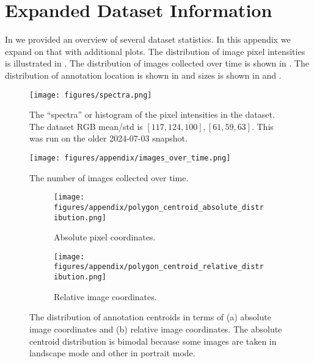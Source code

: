 \appendix

\section{Expanded Dataset Information}

In  we provided an overview of several dataset statistics.
In this appendix we expand on that with additional plots.
The distribution of image pixel intensities is illustrated in .
The distribution of images collected over time is shown in .
The distribution of annotation location is shown in  and sizes is shown
  in  and .


\begin{figure}[ht]
\centering
\texttt{[image: figures/spectra.png]}
\caption[]{
    The ``spectra'' or histogram of the pixel intensities in the dataset. 
    The dataset RGB mean/std is $[117, 124, 100], [61, 59, 63]$. 
    This was run on the older 2024-07-03 snapshot.
}
\label{fig:spectra}
\end{figure}


\begin{figure}[ht]
\centering
\texttt{[image: figures/appendix/images\_over\_time.png]}
\caption[]{
    The number of images collected over time.
}
\label{fig:images_over_time}
\end{figure}


\begin{figure}[ht]
\centering
\begin{subfigure}[b]{0.4\textwidth}
 \texttt{[image: figures/appendix/polygon\_centroid\_absolute\_distribution.png]}
 \caption{Absolute pixel coordinates.}
 \label{fig:centroid_abs}
\end{subfigure}
\hfill
\begin{subfigure}[b]{0.4\textwidth}
 \texttt{[image: figures/appendix/polygon\_centroid\_relative\_distribution.png]}
 \caption{Relative image coordinates.}
 \label{fig:centroid_rel}
\end{subfigure}
\caption{The distribution of annotation centroids in terms of (a) absolute image coordinates and (b) relative image coordinates. The absolute centroid distribution is bimodal because some images are taken in landscape mode and other in portrait mode.}
\label{fig:centroid_location_distri}
\end{figure}


